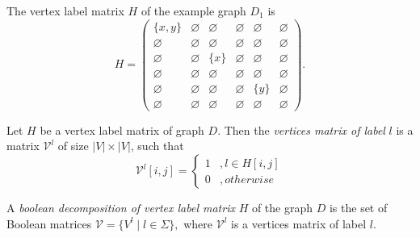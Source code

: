 The vertex label matrix $H$ of the example graph $D_1$ is
{
    \renewcommand{\arraystretch}{0.5}
    \setlength\arraycolsep{1.5pt}
$$
    H =
    \begin{pmatrix}
    \{x, y\}        & \varnothing     &   \varnothing      &   \varnothing   &   \varnothing   &    \varnothing  \\
    \varnothing     &   \varnothing   & \varnothing        &   \varnothing   & \varnothing     & \varnothing     \\
    \varnothing     &   \varnothing   &   \{x\}            &   \varnothing   & \varnothing     &   \varnothing   \\
    \varnothing     &   \varnothing   & \varnothing        &   \varnothing   &   \varnothing   &   \varnothing   \\
    \varnothing     &   \varnothing   &   \varnothing      &    \varnothing  &   \{y\}         & \varnothing     \\
    \varnothing     & \varnothing     &   \varnothing      &   \varnothing   & \varnothing     &   \varnothing
    \end{pmatrix}.
$$
}

\begin{definition}
Let $H$ be a vertex label matrix of graph $D$. Then the \emph{vertices matrix of label} $l$ is a matrix $\mathcal{V}^l$ of size $|V|\times|V|$, such that
\begin{equation*}
\mathcal{V}^l[i,j] =
  \begin{cases}
    1  &, l \in H[i, j] \\
    0  &, otherwise
  \end{cases}
\end{equation*}
\end{definition}

\begin{definition}
A \emph{boolean decomposition of vertex label matrix} $H$ of the graph $D$ is the set of Boolean matrices
$\mathcal{V} = \{V^l \mid l \in \Sigma\},$
where $\mathcal{V}^l$ is a vertices matrix of label $l$.
\end{definition}

